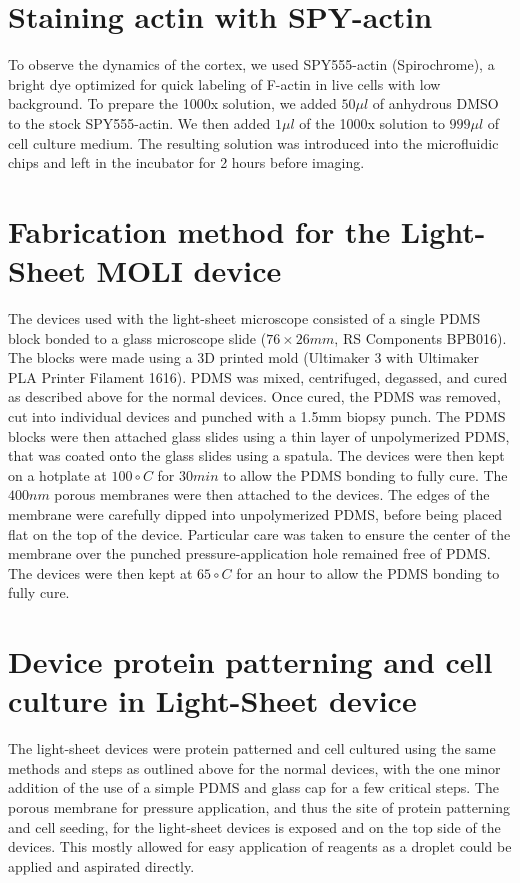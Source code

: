 \section{Staining actin with SPY-actin}

To observe the dynamics of the cortex, we used SPY555-actin (Spirochrome), a bright dye optimized for quick labeling of F-actin in live cells with low background. To prepare the 1000x solution, we added  $50\mu l$ of anhydrous DMSO to the stock SPY555-actin. We then added $1 \mu l$ of the 1000x solution to $999\mu l$ of cell culture medium. The resulting solution was introduced into the microfluidic chips and left in the incubator for 2 hours before imaging.

\section{Fabrication method for the Light-Sheet MOLI device }

The devices used with the light-sheet microscope consisted of a single PDMS block bonded to a glass microscope slide ($76 \times 26 mm$, RS Components BPB016). The blocks were made using a 3D printed mold (Ultimaker 3 with Ultimaker PLA Printer Filament 1616). PDMS was mixed, centrifuged, degassed, and cured as described above for the normal devices. Once cured, the PDMS was removed, cut into individual devices and punched with a 1.5mm biopsy punch. The PDMS blocks were then attached glass slides using a thin layer of unpolymerized PDMS, that was coated onto the glass slides using a spatula. The devices were then kept on a hotplate at $100\circ C$ for $30min$ to allow the PDMS bonding to fully cure. The $400nm$ porous membranes were then attached to the devices. The edges of the membrane were carefully dipped into unpolymerized PDMS, before being placed flat on the top of the device. Particular care was taken to ensure the center of the membrane over the punched pressure-application hole remained free of PDMS. The devices were then kept at $65\circ C$ for an hour to allow the PDMS bonding to fully cure.

\section{Device protein patterning and cell culture in Light-Sheet device}

The light-sheet devices were protein patterned and cell cultured using the same methods and steps as outlined above for the normal devices, with the one minor addition of the use of a simple PDMS and glass cap for a few critical steps. The porous membrane for pressure application, and thus the site of protein patterning and cell seeding, for the light-sheet devices is exposed and on the top side of the devices. This mostly allowed for easy application of reagents as a droplet could be applied and aspirated directly. 

